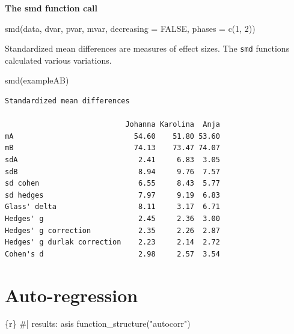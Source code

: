 \documentclass[
  letterpaper,
  DIV=11,
  numbers=noendperiod]{scrreprt}
\newenvironment{Shaded}{\begin{snugshade}}{\end{snugshade}}
\newcommand{\CommentTok}[1]{\textcolor[rgb]{0.37,0.37,0.37}{#1}}
\newcommand{\FunctionTok}[1]{\textcolor[rgb]{0.28,0.35,0.67}{#1}}
\newcommand{\InformationTok}[1]{\textcolor[rgb]{0.37,0.37,0.37}{#1}}
\newcommand{\NormalTok}[1]{\textcolor[rgb]{0.00,0.23,0.31}{#1}}
\newcommand{\StringTok}[1]{\textcolor[rgb]{0.13,0.47,0.30}{#1}}
\begin{document}
\begin{tcolorbox}[enhanced jigsaw, breakable, rightrule=.15mm, bottomrule=.15mm, arc=.35mm, colback=white, colframe=quarto-callout-tip-color-frame, opacityback=0, leftrule=.75mm, toprule=.15mm, left=2mm]
\begin{minipage}[t]{5.5mm}
\textcolor{quarto-callout-tip-color}{\faLightbulb}
\end{minipage}%
\begin{minipage}[t]{\textwidth - 5.5mm}

\textbf{The smd function call}\vspace{2mm}

smd(data, dvar, pvar, mvar, decreasing = FALSE, phases = c(1, 2))

\end{minipage}%
\end{tcolorbox}

Standardized mean differences are measures of effect sizes. The
\texttt{smd} functions calculated various variations.

\begin{Shaded}
\begin{Highlighting}[]
\FunctionTok{smd}\NormalTok{(exampleAB)}
\end{Highlighting}
\end{Shaded}

\begin{verbatim}
Standardized mean differences

                            Johanna Karolina  Anja
mA                            54.60    51.80 53.60
mB                            74.13    73.47 74.07
sdA                            2.41     6.83  3.05
sdB                            8.94     9.76  7.57
sd cohen                       6.55     8.43  5.77
sd hedges                      7.97     9.19  6.83
Glass' delta                   8.11     3.17  6.71
Hedges' g                      2.45     2.36  3.00
Hedges' g correction           2.35     2.26  2.87
Hedges' g durlak correction    2.23     2.14  2.72
Cohen's d                      2.98     2.57  3.54
\end{verbatim}

\hypertarget{auto-regression}{%
\section{Auto-regression}\label{auto-regression}}

\begin{Shaded}
\begin{Highlighting}[]
\InformationTok{\textasciigrave{}\textasciigrave{}\textasciigrave{}\{r\}}
\CommentTok{\#| results: asis}
\FunctionTok{function\_structure}\NormalTok{(}\StringTok{"autocorr"}\NormalTok{)}
\InformationTok{\textasciigrave{}\textasciigrave{}\textasciigrave{}}
\end{Highlighting}
\end{Shaded}
\end{document}
